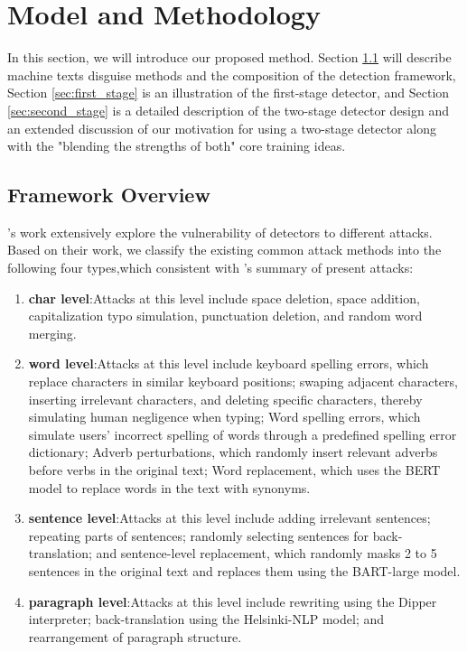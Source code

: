 \documentclass[11pt]{article}
\newcommand{\greenCite}[1]{\textcolor{darkgreen}{\cite{#1}}}
\newcommand{\greenCitep}[1]{\textcolor{darkgreen}{\citep{#1}}}
\begin{document}
	
	\section{Model and Methodology}
	In this section, we will introduce our proposed method. Section \ref{sec:framework} will describe machine texts disguise methods and the composition of the detection framework, Section \ref{sec:first_stage} is an illustration of the first-stage detector, and Section \ref{sec:second_stage} is a detailed description of the two-stage detector design and an extended discussion of our motivation for using a two-stage detector along with the "blending the strengths of both" core training ideas.
	
	\subsection{Framework Overview}
	\label{sec:framework}
	\greenCite{zhou2024navigatingshadows,huang2024ai}'s work extensively explore the vulnerability of detectors to different attacks. Based on their work, we classify the existing common attack methods into the following four types,which consistent with \greenCite{zhou2024navigatingshadows}'s summary of present attacks:
	\begin{enumerate}
		\item \textbf{char level}:Attacks at this level include space deletion, space addition\greenCitep{cai2023evadechatgpt}, capitalization typo simulation, punctuation deletion, and random word merging.
		\item \textbf{word level}:Attacks at this level include keyboard spelling errors, which replace characters in similar keyboard positions; swaping adjacent characters, inserting irrelevant characters, and deleting specific characters, thereby simulating human negligence when typing; Word spelling errors, which simulate users' incorrect spelling of words through a predefined spelling error dictionary; Adverb perturbations, which randomly insert relevant adverbs before verbs in the original text; Word replacement, which uses the BERT model\greenCitep{devlin2019bert} to replace words in the text with synonyms.
		\item \textbf{sentence level}:Attacks at this level include adding irrelevant sentences; repeating parts of sentences; randomly selecting sentences for back-translation; and sentence-level replacement, which randomly masks 2 to 5 sentences in the original text and replaces them using the BART-large model\greenCitep{lewis2020bart}.
		\item \textbf{paragraph level}:Attacks at this level include rewriting using the Dipper interpreter\greenCitep{krishna2024paraphrasing}; back-translation using the Helsinki-NLP model\greenCitep{tiedemann2020opus}; and rearrangement of paragraph structure.
	\end{enumerate}
\end{document}
